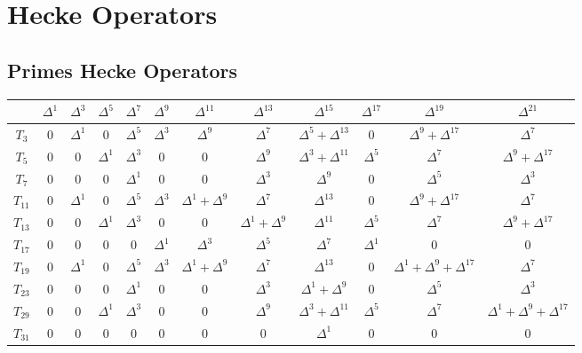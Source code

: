 \section{Hecke Operators}
\subsection{Primes Hecke Operators}
\label{table:PrimeHeckeOperators}
\begin{center}
\begin{tabular}{|c|ccccccccccc|}
	\hline
	\textbf{} & \textbf{$\Delta^1$} & \textbf{$\Delta^3$} & \textbf{$\Delta^5$} & \textbf{$\Delta^7$} & \textbf{$\Delta^9$} & \textbf{$\Delta^{11}$} & \textbf{$\Delta^{13}$} & \textbf{$\Delta^{15}$} & \textbf{$\Delta^{17}$} & \textbf{$\Delta^{19}$} & \textbf{$\Delta^{21}$} \\\hline    
	$T_3$ & 0 & $\Delta^1$ & 0 & $\Delta^5$ & $\Delta^3$ & $\Delta^9$ & $\Delta^7$ & $\Delta^5 + \Delta^{13}$ & 0 & $\Delta^9 + \Delta^{17}$ & $\Delta^7$ \\
	$T_5$ & 0 & 0 & $\Delta^1$ & $\Delta^3$ & 0 & 0 & $\Delta^9$ & $\Delta^3 + \Delta^{11}$ & $\Delta^5$ & $\Delta^7$ & $\Delta^9 + \Delta^{17}$ 
	\\
	$T_7$ & 0 & 0 & 0 & $\Delta^1$ & 0 & 0 & $\Delta^3$ & $\Delta^9$ & 0 & $\Delta^5$ & $\Delta^3$ \\
	$T_{11}$ & 0 & $\Delta^1$ & 0 & $\Delta^5$ & $\Delta^3$ & $\Delta^1 + \Delta^9$ & $\Delta^7$ & $\Delta^{13}$ & 0 & $\Delta^9 + \Delta^{17}$ & $\Delta^7$ \\
	$T_{13}$ & 0 & 0 & $\Delta^1$ & $\Delta^3$ & 0 & 0 & $\Delta^1 + \Delta^9$ & $\Delta^{11}$ & $\Delta^5$ & $\Delta^7$ & $\Delta^9 + \Delta^{17}$ \\
	$T_{17}$ & 0 & 0 & 0 & 0 & $\Delta^1$ & $\Delta^3$ & $\Delta^5$ & $\Delta^7$ & $\Delta^1$ & 0 & 0 \\
	$T_{19}$ & 0 & $\Delta^1$ & 0 & $\Delta^5$ & $\Delta^3$ & $\Delta^1 + \Delta^9$ & $\Delta^7$ & $\Delta^{13}$ & 0 & $\Delta^1 + \Delta^9 + \Delta^{17}$ & $\Delta^7$ \\
	$T_{23}$ & 0 & 0 & 0 & $\Delta^1$ & 0 & 0 & $\Delta^3$ & $\Delta^1 + \Delta^9$ & 0 & $\Delta^5$ & $\Delta^3$ \\
	$T_{29}$ & 0 & 0 & $\Delta^1$ & $\Delta^3$ & 0 & 0 & $\Delta^9$ & $\Delta^3 + \Delta^{11}$ & $\Delta^5$ & $\Delta^7$ & $\Delta^1 + \Delta^9 + \Delta^{17}$ \\
	$T_{31}$ & 0 & 0 & 0 & 0 & 0 & 0 & 0 & $\Delta^1$ & 0 & 0 & 0 \\

\end{tabular}
\end{center}
